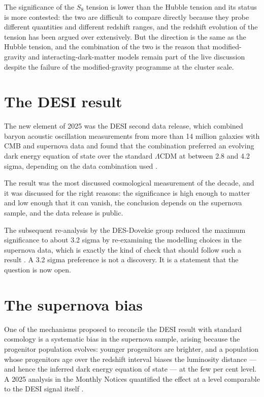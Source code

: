 The significance of the $S_8$ tension is lower than the Hubble tension and its
status is more contested: the two are difficult to compare directly because
they probe different quantities and different redshift ranges, and the
redshift evolution of the tension has been argued over extensively. But the
direction is the same as the Hubble tension, and the combination of the two
is the reason that modified-gravity and interacting-dark-matter models remain
part of the live discussion despite the failure of the modified-gravity
programme at the cluster scale.

\section{The DESI result}The new element of 2025 was the DESI second data
release, which combined baryon acoustic oscillation measurements from more
than 14 million galaxies with CMB and supernova data and found that the
combination preferred an evolving dark energy equation of state over the
standard $\Lambda$CDM at between 2.8 and 4.2 sigma, depending on the data
combination used .

The result was the most discussed cosmological measurement of the decade,
and it was discussed for the right reasons: the significance is high enough
to matter and low enough that it can vanish, the conclusion depends on the
supernova sample, and the data release is public.

The subsequent re-analysis by the DES-Dovekie group reduced the maximum
significance to about 3.2 sigma by re-examining the modelling choices in the
supernova data, which is exactly the kind of check that should follow such a
result . A 3.2 sigma preference is not a
discovery. It is a statement that the question is now open.

\section{The supernova bias}One of the mechanisms proposed to reconcile the
DESI result with standard cosmology is a systematic bias in the supernova
sample, arising because the progenitor population evolves: younger
progenitors are brighter, and a population whose progenitors age over the
redshift interval biases the luminosity distance --- and hence the inferred
dark energy equation of state --- at the few per cent level. A 2025
analysis in the Monthly Notices quantified the effect at a level comparable
to the DESI signal itself .

